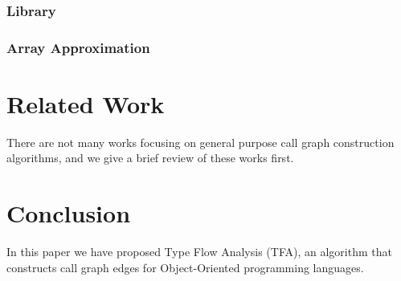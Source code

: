 \documentclass{fac}
\begin{document}
\subsubsection{Library}\label{subsubsec:library}
\subsubsection{Array Approximation}\label{subsubsec:array-approximation}

\section{Related Work}\label{sec:related-work}
There are not many works focusing on general purpose call graph construction algorithms, and we give a brief review of these works first.

\section{Conclusion}\label{sec:conclusion}
In this paper we have proposed Type Flow Analysis (TFA), an algorithm that constructs call graph edges for Object-Oriented programming languages.

\label{lastpage}
\end{document}
